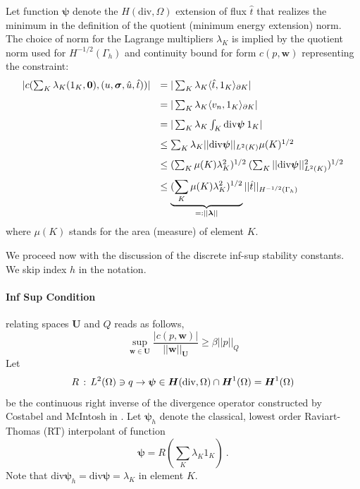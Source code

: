 \documentclass[letterpaper]{article}
\newcommand{\ptl}{{\partial}}
\newcommand{\bfsig}{\mbox{\boldmath $\sigma$}}
\newcommand{\bfU}{\boldsymbol U}
\newcommand{\bfw}{\boldsymbol w}
\newcommand{\bfpsi}{\boldsymbol\psi}
\newcommand{\bflambda}{\boldsymbol\lambda}
\newcommand{\bfH}{\mbox{\boldmath $H$}}
\begin{document}
Let function $\bfpsi$ denote the $H(\text{div},\Omega)$ extension of flux $\hat{t}$
that realizes the minimum in the definition of the quotient (minimum energy
extension) norm.
The choice of norm for the Lagrange multipliers $\lambda_K$ is implied
by the quotient norm used for $H^{-1/2}(\Gamma_h)$ and continuity
bound for form $c(p,\bfw)$ representing the constraint:
\begin{equation}
\begin{array}{lll}
| c(\sum_K \lambda_K (1_K,{\bf 0}),(u,\bfsig,\hat{u},\hat{t})) |
& = | \sum_K \lambda_K \langle \hat{t}, 1_K \rangle_{\ptl K} | \\[8pt]
& = | \sum_K \lambda_K \langle v_n , 1_K \rangle_{\ptl K} | \\[8pt]
& = | \sum_K \lambda_K \int_K \text{div} \bfpsi \: 1_K  | \\[8pt]
& \leq \sum_K  \lambda_K || \text{div} \bfpsi ||_{L^2(K)} \mu(K)^{1/2} \\[8pt]
& \leq (\sum_K \mu(K) \lambda_K^2)^{1/2} \: (\sum_K || \text{div} \bfpsi ||_{L^2(K)}^2 )^{1/2} \\[8pt]
& \leq \underbrace{(\sum_K \mu(K) \lambda_K^2)^{1/2}}_{=: || \bflambda ||} ||
\hat{t} ||_{H^{-1/2}(\Gamma_h)}
\end{array}
\end{equation}
where $\mu(K)$ stands for the area (measure) of element $K$.

We proceed now with the discussion of the discrete inf-sup stability constants. We skip
index $h$ in the notation.

\paragraph{Inf Sup Condition} relating spaces $\bfU$ and $Q$ reads as follows,
\begin{equation}
   \sup_{\bfw \in \bfU} \frac{| c(p,\bfw) |}{|| \bfw ||_{\bfU}} \geq \beta ||
   p ||_Q
\end{equation}
Let
\begin{equation}
R\, : \, L^2(\Omega) \ni q \to \bfpsi \in \bfH(\text{div},\Omega) \cap \bfH^1(\Omega)
=\bfH^1(\Omega)
\end{equation}
be
the continuous right inverse of the divergence operator constructed by
Costabel and McIntosh in \cite{CostabelMcIntosh}.
Let $\bfpsi_h$ denote the classical, lowest order Raviart-Thomas (RT) interpolant of
function
\begin{equation}
\bfpsi = R (\sum_K \lambda_K 1_K) \: .
\end{equation}
Note that $\text{div} \bfpsi_h = \text{div} \bfpsi = \lambda_K$ in element $K$.
\end{document}
